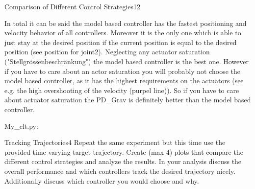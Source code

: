 \begin{questions}
\begin{question}{Comparison of Different Control Strategies}{12}
\begin{answer}
In total it can be said the model based controller has the fastest positioning and velocity behavior of all controllers. Moreover it is the only one which is able to just stay at the desired position if the current position is equal to the desired position (see position for joint2). Neglecting any actuator saturation ("Stellgr\"ossenbeschr\"ankung") the model based controller is the best one. However if you have to care about an actor saturation you will probably not choose the model based controller, as it has the highest 
requirements on the actuators (see e.g. the high overshooting of the velocity (purpel line)). So if you have to care about actuator saturation the PD\_Grav is definitely better than the model based controller.

My\_clt.py:\\

	\end{answer}

		
	
	\end{question}
	
	
	\begin{question}{Tracking Trajectories}{4}
		Repeat the same experiment but this time use the provided time-varying target trajectory. Create (max 4) plots that compare the different control strategies and analyze the results. In your analysis discuss the overall performance and which controllers track the desired trajectory nicely. Additionally discuss which controller you would choose and why.
		

\end{question}
\end{questions}

